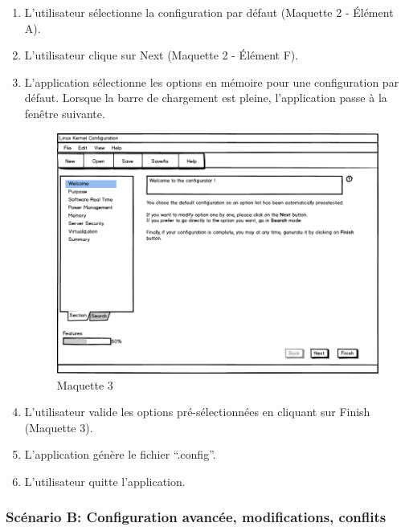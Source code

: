 \documentclass[16pts]{report}
\begin{document}
\begin{enumerate}
    \item L'utilisateur sélectionne la configuration par défaut (Maquette 2 -
        Élément A).
    \item L’utilisateur clique sur Next (Maquette 2 - Élément F).
    \item L’application sélectionne les options en mémoire pour une
            configuration par défaut. Lorsque la barre de chargement est pleine,
            l’application passe à la fenêtre suivante.
    \begin{figure}[H]
        \includegraphics[scale=0.5]{illustrations/maquettes/Maquette_3_MainWindowStart.png}
        \centering
        \caption{Maquette 3}
        \label{fig:Maq3}
    \end{figure}
    \item L’utilisateur valide les options pré-sélectionnées en cliquant sur
        Finish (Maquette 3).
    \item L’application génère le fichier “.config”.
    \item L’utilisateur quitte l’application.
\end{enumerate}

\subsubsection{Scénario B: Configuration avancée, modifications, conflits}
\label{sssub:Scénario B: Configuration avancée, modifications, conflits}
\end{document}
